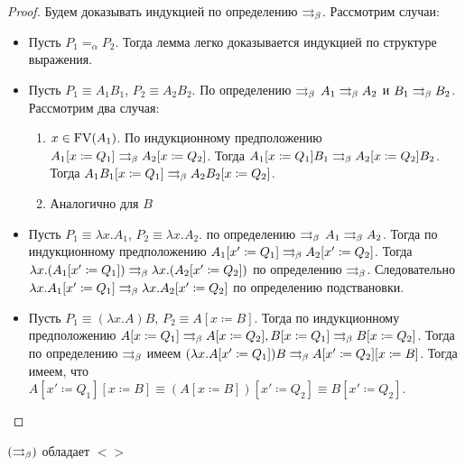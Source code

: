 \begin{proof}
	Будем доказывать индукцией по определению $\rightrightarrows_{\beta} $. Рассмотрим случаи:
	\begin{itemize}
		\item Пусть $P_{1}=_{\alpha}P_{2}$. Тогда лемма легко доказывается индукцией по структуре выражения.
		\item Пусть $P_{1}\equiv{}A_{1}B_{1}$, $P_{2}\equiv{}A_{2}B_{2}$. По определению $\rightrightarrows_{\beta}$ $A_{1} \rightrightarrows_{\beta} A_{2}$ и $B_{1} \rightrightarrows_{\beta} B_{2}$.
		Рассмотрим два случая:
		\begin{enumerate}
			\item $x \in \operatorname{FV}(A_{1})$. По индукционному предположению $A_{1}[x\coloneqq{}Q_{1}] \rightrightarrows_{\beta} A_{2}[x\coloneqq{}Q_{2}]$. Тогда $A_{1}[x\coloneqq{}Q_{1}]B_{1} \rightrightarrows_{\beta} A_{2}[x\coloneqq{}Q_{2}]B_{2}$. Тогда $A_{1}B_{1}[x\coloneqq{}Q_{1}] \rightrightarrows_{\beta} A_{2}B_{2}[x\coloneqq{}Q_{2}]$.
			\item Аналогично для $B$
		\end{enumerate}
		\item Пусть $P_{1}\equiv{}\lambda{}x.A_{1}$, $P_{2}\equiv{}\lambda{}x.A_{2}$. по определению $\rightrightarrows_{\beta}$ $A_{1}\rightrightarrows_{\beta} A_{2}$. Тогда по индукционному предположению $A_{1}[x'\coloneqq{}Q_{1}] \rightrightarrows_{\beta} A_{2}[x'\coloneqq{}Q_{2}]$. Тогда 
		$\lambda{}x.(A_{1}[x'\coloneqq{}Q_{1}]) \rightrightarrows_{\beta} \lambda{}x.(A_{2}[x'\coloneqq{}Q_{2}])$ по определению $\rightrightarrows_{\beta}$. Следовательно 	$\lambda{}x.A_{1}[x'\coloneqq{}Q_{1}] \rightrightarrows_{\beta} \lambda{}x.A_{2}[x'\coloneqq{}Q_{2}]$ по определению подствановки.
		\item Пусть $P_{1}\equiv(\lambda{}x.A)B$, $P_{2}\equiv A[x\coloneqq{}B]$. Тогда по индукционному предположению $A[x\coloneq{}Q_{1}] \rightrightarrows_{\beta} A[x\coloneqq{}Q_{2}], B[x\coloneq{}Q_{1}] \rightrightarrows_{\beta} B[x\coloneqq{}Q_{2}]$. Тогда по определению $\rightrightarrows_{\beta}$ имеем $(\lambda{}x.A[x'\coloneqq{}Q_1])B \rightrightarrows_{\beta} A[x'\coloneqq{}Q_2][x\coloneqq{}B]$. Тогда имеем, что $A[x'\coloneqq{}Q_1][x\coloneqq{}B] \equiv (A[x\coloneqq{}B])[x'\coloneqq{}Q_2] \equiv B[x'\coloneqq{}Q_{2}]$.
	\end{itemize}
\end{proof}

\begin{lemma}
	$(\rightrightarrows_{\beta} )$ обладает $<>$
\end{lemma}

